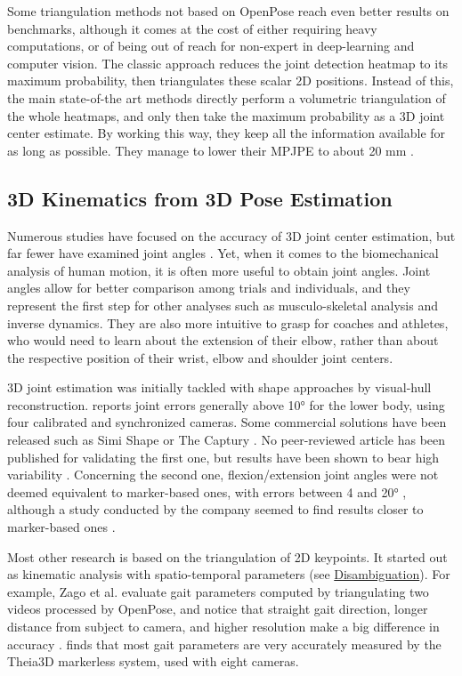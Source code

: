 Some triangulation methods not based on OpenPose reach even better results on benchmarks, although it comes at the cost of either requiring heavy computations, or of being out of reach for non-expert in deep-learning and computer vision. The classic approach reduces the joint detection heatmap to its maximum probability, then triangulates these scalar 2D positions. Instead of this, the main state-of-the art methods directly perform a volumetric triangulation of the whole heatmaps, and only then take the maximum probability as a 3D joint center estimate. By working this way, they keep all the information available for as long as possible. They manage to lower their MPJPE to about 20 mm \cite{He2020,Iskakov2019}. 


\subsection{3D Kinematics from 3D Pose Estimation}

Numerous studies have focused on the accuracy of 3D joint center estimation, but far fewer have examined joint angles \cite{Zheng2022}. Yet, when it comes to the biomechanical analysis of human motion, it is often more useful to obtain joint angles. Joint angles allow for better comparison among trials and individuals, and they represent the first step for other analyses such as musculo-skeletal analysis and inverse dynamics. They are also more intuitive to grasp for coaches and athletes, who would need to learn about the extension of their elbow, rather than about the respective position of their wrist, elbow and shoulder joint centers. 

3D joint estimation was initially tackled with shape approaches by visual-hull reconstruction. \cite{Ceseracciu2014} reports joint errors generally above 10° for the lower body, using four calibrated and synchronized cameras. Some commercial solutions have been released such as Simi Shape \cite{SimiShape} or The Captury \cite{Captury}. No peer-reviewed article has been published for validating the first one, but results have been shown to bear high variability \cite{Becker2015}. Concerning the second one, flexion/extension joint angles were not deemed equivalent to marker-based ones, with errors between 4 and 20° \cite{Harsted2019}, although a study conducted by the company seemed to find results closer to marker-based ones \cite{Fleisig2022}. 

Most other research is based on the triangulation of 2D keypoints. It started out as kinematic analysis with spatio-temporal parameters (see \hyperlink{Ann:gloss}{Disambiguation}). For example, Zago et al. evaluate gait parameters computed by triangulating two videos processed by OpenPose, and notice that straight gait direction, longer distance from subject to camera, and higher resolution make a big difference in accuracy \cite{Zago2020}. \cite{Kanko2021c} finds that most gait parameters are very accurately measured by the Theia3D markerless system, used with eight cameras.

